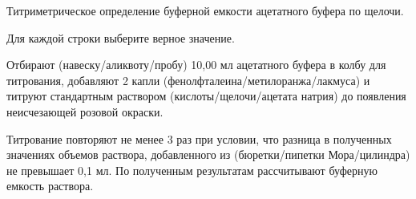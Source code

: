 
Титриметрическое определение буферной емкости ацетатного буфера по щелочи.

Для каждой строки выберите верное значение.

Отбирают (навеску/аликвоту/пробу) 10,00 мл ацетатного буфера в колбу для титрования, добавляют 
2 капли (фенолфталеина/метилоранжа/лакмуса) и титруют стандартным раствором (кислоты/щелочи/ацетата натрия) 
до появления неисчезающей розовой окраски. 

Титрование повторяют не менее 3 раз при условии, что разница в полученных значениях объемов 
раствора, добавленного из (бюретки/пипетки Мора/цилиндра) не превышает 0,1 мл. По полученным результатам рассчитывают 
буферную емкость раствора.

